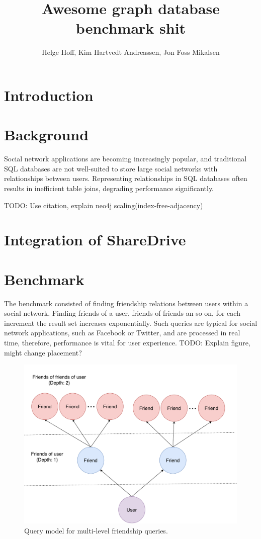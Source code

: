 \documentclass[a4paper, 12pt, conference]{IEEEtran}
\newcommand{\todo}[1]{}
\renewcommand{\todo}[1]{{\color{blue} TODO:  {#1}}}
\def \thetitle {Awesome graph database benchmark shit}
\def \theauthor {Helge Hoff, Kim Hartvedt Andreassen, Jon Foss Mikalsen}
\begin{document}
\title{\thetitle}
\author{\theauthor}

\maketitle
\thispagestyle{plain}

 
\IEEEpeerreviewmaketitle

\section{Introduction}

\section{Background}
Social network applications are becoming increasingly popular, and traditional SQL databases are not well-suited to store large social networks with relationships between users.
Representing relationships in SQL databases often results in inefficient table joins, degrading performance significantly.
 
\todo{Use citation, explain neo4j scaling(index-free-adjacency)}
\cite{neo_scale}
\section{Integration of ShareDrive}
\section{Benchmark}
The benchmark consisted of finding friendship relations between users within a social network.
Finding friends of a user, friends of friends an so on, for each increment the result set increases exponentially.
Such queries are typical for social network applications, such as Facebook or Twitter, and are processed in real time, therefore, performance is vital for user experience.
\todo{Explain figure, might change placement?}
\begin{figure}[h]
	\centering
	\includegraphics[scale=0.3]{friends.pdf}
	\caption{Query model for multi-level friendship queries.}
\end{figure}
\end{document}
